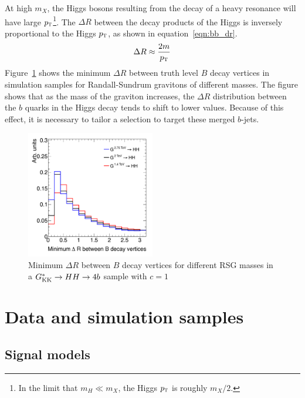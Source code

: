 At high $m_{X}$, the Higgs bosons resulting from the decay of a heavy resonance will have large $p_{\textrm{\footnotesize\sc t}}$\footnote{In the limit that $m_{H} \ll m_{X}$, the Higgs $p_{\textrm{\footnotesize\sc t}}$ is roughly $m_{X}/2$.}. The $\Delta R$ between the decay products of the Higgs is inversely proportional to the Higgs $p_{\textrm{\footnotesize\sc t}}$, as shown in equation~\ref{eqn:bb_dr}. 
%
\begin{equation}
\label{eqn:bb_dr}
\Delta R \approx \frac{2m}{p_{\textrm{\footnotesize\sc t}}}
\end{equation}
%
Figure~\ref{fig:bb_dr} shows the minimum $\Delta R$ between truth level $B$ decay vertices in simulation samples for Randall-Sundrum gravitons of different masses. The figure shows that as the mass of the graviton increases, the $\Delta R$ distribution between the $b$ quarks in the Higgs decay tends to shift to lower values. Because of this effect, it is necessary to tailor a selection to target these merged $b$-jets. 

\begin{figure}[h!]
  \centering
  \captionsetup{justification=centering}

  \includegraphics[width=0.5\textwidth]{figures/min_dR_bb}
  \caption{Minimum $\Delta R$ between $B$ decay vertices for different RSG masses in a $G^*_{\rm KK} \to HH \to 4b$ sample with $c = 1$}
  \label{fig:bb_dr}
\end{figure}

\section{Data and simulation samples}

\subsection{Signal models}


